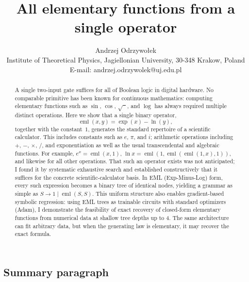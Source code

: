 \documentclass[12pt]{article}
\DeclareMathOperator{\eml}{eml}
\begin{document}
\title{All elementary functions from a single operator
}

\author{Andrzej Odrzywo{\l}ek\\
\small Institute of Theoretical Physics, Jagiellonian University, 30-348 Krakow, Poland\\
\small E-mail: andrzej.odrzywolek@uj.edu.pl}



\maketitle


\begin{abstract}
A single two-input gate suffices for all of Boolean logic in digital hardware. No comparable primitive has been known for continuous mathematics: computing elementary functions such as $\sin$, $\cos$, $\sqrt{\phantom{x}}$, and $\log$ has always required multiple distinct operations. Here we show that a single binary operator, 
$$\eml(x,y)=\exp(x)-\ln(y),$$ together with the constant~$1$, generates the standard repertoire of a scientific calculator. This includes constants such as $e$, $\pi$, and $i$; arithmetic operations including $+$, $-$, $\times$, $/$, and exponentiation as well as the usual transcendental and algebraic functions. For example, $e^x=\eml(x,1)$, $\ln x=\eml(1,\eml(\eml(1,x),1))$, and likewise for all other operations. That such an operator exists was not anticipated; I found it by systematic exhaustive search and established constructively that it suffices for the concrete scientific-calculator basis.
In EML (Exp-Minus-Log) form, every such expression becomes a binary tree of identical nodes, yielding a grammar as simple as $S\!\to\!1\mid\eml(S,S)$. This uniform structure also enables gradient-based symbolic regression: using EML trees as trainable circuits with standard optimizers (Adam), I demonstrate the feasibility of exact recovery of closed-form elementary functions from numerical data at shallow tree depths up to 4. The same architecture can fit arbitrary data, but when the generating law is elementary, it may recover the exact formula.
\end{abstract}


\clearpage


\subsection*{Summary paragraph}
\end{document}
